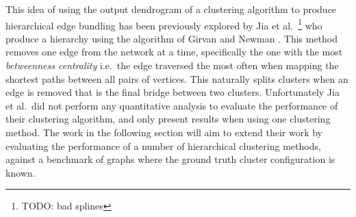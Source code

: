 This idea of using the output dendrogram of a clustering algorithm to produce hierarchical edge bundling has been previously explored by Jia et al.\ \cite{Jia2011}\footnote{TODO: bad splines} who produce a hierarchy using the algorithm of Girvan and Newman \cite{Girvan2002}. This method removes one edge from the network at a time, specifically the one with the most \emph{betweenness centrality} i.e.\ the edge traversed the most often when mapping the shortest paths between all pairs of vertices. This naturally splits clusters when an edge is removed that is the final bridge between two clusters.
Unfortunately Jia et al.\ did not perform any quantitative analysis to evaluate the performance of their clustering algorithm, and only present results when using one clustering method. The work in the following section will aim to extend their work by evaluating the performance of a number of hierarchical clustering methods, against a benchmark of graphs where the ground truth cluster configuration is known.

